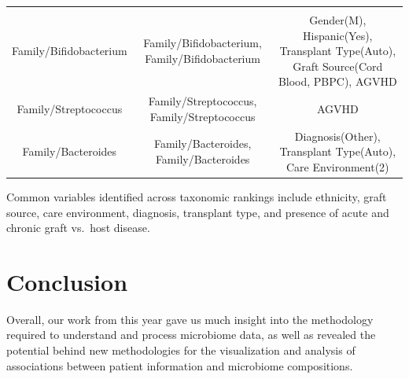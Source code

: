 \documentclass[12pt,twoside]{dukestatscithesis}
\begin{document}
\begin{longtable}[]{@{}ccc@{}}
\begin{minipage}[t]{0.22\columnwidth}
\end{minipage}\tabularnewline
\begin{minipage}[t]{0.23\columnwidth}\centering\strut
Family/Bifidobacterium\strut
\end{minipage} & \begin{minipage}[t]{0.46\columnwidth}\centering\strut
Family/Bifidobacterium, Family/Bifidobacterium\strut
\end{minipage} & \begin{minipage}[t]{0.22\columnwidth}\centering\strut
Gender(M), Hispanic(Yes), Transplant Type(Auto), Graft Source(Cord
Blood, PBPC), AGVHD\strut
\end{minipage}\tabularnewline
\begin{minipage}[t]{0.23\columnwidth}\centering\strut
Family/Streptococcus\strut
\end{minipage} & \begin{minipage}[t]{0.46\columnwidth}\centering\strut
Family/Streptococcus, Family/Streptococcus\strut
\end{minipage} & \begin{minipage}[t]{0.22\columnwidth}\centering\strut
AGVHD\strut
\end{minipage}\tabularnewline
\begin{minipage}[t]{0.23\columnwidth}\centering\strut
Family/Bacteroides\strut
\end{minipage} & \begin{minipage}[t]{0.46\columnwidth}\centering\strut
Family/Bacteroides, Family/Bacteroides\strut
\end{minipage} & \begin{minipage}[t]{0.22\columnwidth}\centering\strut
Diagnosis(Other), Transplant Type(Auto), Care Environment(2)\strut
\end{minipage}\tabularnewline
\bottomrule
\end{longtable}
Common variables identified across taxonomic rankings include ethnicity,
graft source, care environment, diagnosis, transplant type, and presence
of acute and chronic graft vs.~host disease.

\chapter*{Conclusion}\label{conclusion}

Overall, our work from this year gave us much insight into the
methodology required to understand and process microbiome data, as well
as revealed the potential behind new methodologies for the visualization
and analysis of associations between patient information and microbiome
compositions.
\end{document}
